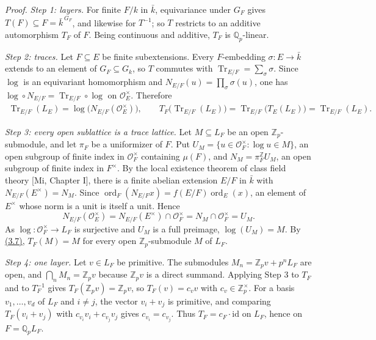 \documentclass[11pt,a4paper]{amsart}
\begin{document}
\emph{Proof.} \emph{Step 1: layers.} For finite $F/k$ in $\bar k$, equivariance under $G_F$ gives $T(F)\subseteq F=\bar k^{\,G_F}$, and likewise for $T^{-1}$; so $T$ restricts to an additive automorphism $T_F$ of $F$. Being continuous and additive, $T_F$ is $\mathbb Q_p$-linear.

\emph{Step 2: traces.} Let $F\subseteq E$ be finite subextensions. Every $F$-embedding $\sigma\colon E\to\bar k$ extends to an element of $G_F\subseteq G_k$, so $T$ commutes with $\operatorname{Tr}_{E/F}=\sum_\sigma\sigma$. Since $\log$ is an equivariant homomorphism and $N_{E/F}(u)=\prod_\sigma\sigma(u)$, one has $\log\circ N_{E/F}=\operatorname{Tr}_{E/F}\circ\log$ on $\mathcal O_E^\times$. Therefore
\begin{equation}
\begin{gathered}
\operatorname{Tr}_{E/F}(L_E)=\log\bigl(N_{E/F}(\mathcal O_E^\times)\bigr),\qquad
T_F\bigl(\operatorname{Tr}_{E/F}(L_E)\bigr)=\operatorname{Tr}_{E/F}\bigl(T_E(L_E)\bigr)=\operatorname{Tr}_{E/F}(L_E).
\end{gathered}
\tag{3.7}\label{eq:3.7}
\end{equation}

\emph{Step 3: every open sublattice is a trace lattice.} Let $M\subseteq L_F$ be an open $\mathbb Z_p$-submodule, and let $\pi_F$ be a uniformizer of $F$. Put $U_M=\{u\in\mathcal O_F^\times:\log u\in M\}$, an open subgroup of finite index in $\mathcal O_F^\times$ containing $\mu(F)$, and $N_M=\pi_F^{\mathbb Z}U_M$, an open subgroup of finite index in $F^\times$. By the local existence theorem of class field theory [Mi, Chapter I], there is a finite abelian extension $E/F$ in $\bar k$ with $N_{E/F}(E^\times)=N_M$. Since $\operatorname{ord}_F(N_{E/F}x)=f(E/F)\operatorname{ord}_E(x)$, an element of $E^\times$ whose norm is a unit is itself a unit. Hence
\[
N_{E/F}(\mathcal O_E^\times)=N_{E/F}(E^\times)\cap\mathcal O_F^\times=N_M\cap\mathcal O_F^\times=U_M .
\]
As $\log\colon\mathcal O_F^\times\to L_F$ is surjective and $U_M$ is a full preimage, $\log(U_M)=M$. By \hyperref[eq:3.7]{(3.7)}, $T_F(M)=M$ for every open $\mathbb Z_p$-submodule $M$ of $L_F$.

\emph{Step 4: one layer.} Let $v\in L_F$ be primitive. The submodules $M_n=\mathbb Z_pv+p^nL_F$ are open, and $\bigcap_nM_n=\mathbb Z_pv$ because $\mathbb Z_pv$ is a direct summand. Applying Step 3 to $T_F$ and to $T_F^{-1}$ gives $T_F(\mathbb Z_pv)=\mathbb Z_pv$, so $T_F(v)=c_vv$ with $c_v\in\mathbb Z_p^\times$. For a basis $v_1,\dots,v_d$ of $L_F$ and $i\ne j$, the vector $v_i+v_j$ is primitive, and comparing $T_F(v_i+v_j)$ with $c_{v_i}v_i+c_{v_j}v_j$ gives $c_{v_i}=c_{v_j}$. Thus $T_F=c_F\cdot\mathrm{id}$ on $L_F$, hence on $F=\mathbb Q_pL_F$.
\end{document}
